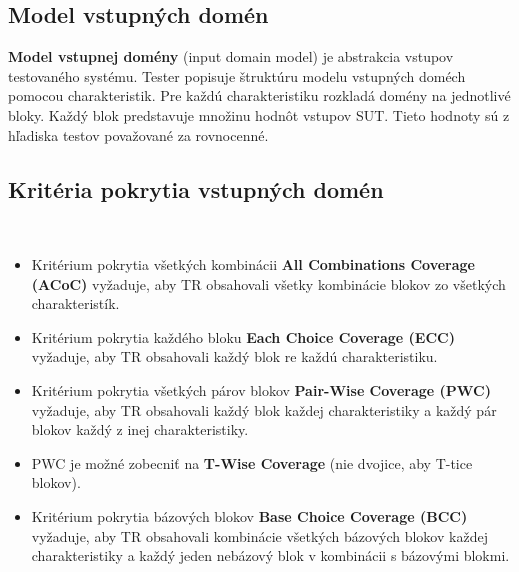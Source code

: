 \subsection*{Model vstupných domén}
\label{model_domen}
\textbf{Model vstupnej domény} (input domain model) je abstrakcia vstupov testovaného systému.
Tester popisuje štruktúru modelu vstupných doméch pomocou charakteristik.
Pre každú charakteristiku rozkladá domény na jednotlivé bloky.
Každý blok predstavuje množinu hodnôt vstupov SUT.
Tieto hodnoty sú z hľadiska testov považované za rovnocenné.

\subsection*{Kritéria pokrytia vstupných domén}\
\label{kriteria_pokrytia_domen}
\begin{itemize}
	\item Kritérium pokrytia všetkých kombinácii \textbf{All Combinations Coverage (ACoC)} vyžaduje, aby TR obsahovali všetky kombinácie blokov zo všetkých charakteristík.
		\\
	\item Kritérium pokrytia každého bloku \textbf{Each Choice Coverage (ECC)} vyžaduje, aby TR obsahovali každý blok re každú charakteristiku.
		\\
	\item Kritérium pokrytia všetkých párov blokov \textbf{Pair-Wise Coverage (PWC)} vyžaduje, aby TR obsahovali každý blok každej charakteristiky a každý pár blokov každý z inej charakteristiky.
		\todo{príklad}\\
	\item PWC je možné zobecniť na \textbf{T-Wise Coverage} (nie dvojice, aby T-tice blokov).
	\item Kritérium pokrytia bázových blokov \textbf{Base Choice Coverage (BCC)} vyžaduje, aby TR obsahovali kombinácie všetkých bázových blokov každej charakteristiky a každý jeden nebázový blok v kombinácii s bázovými blokmi.
		\todo{príklad}\\
\end{itemize}

